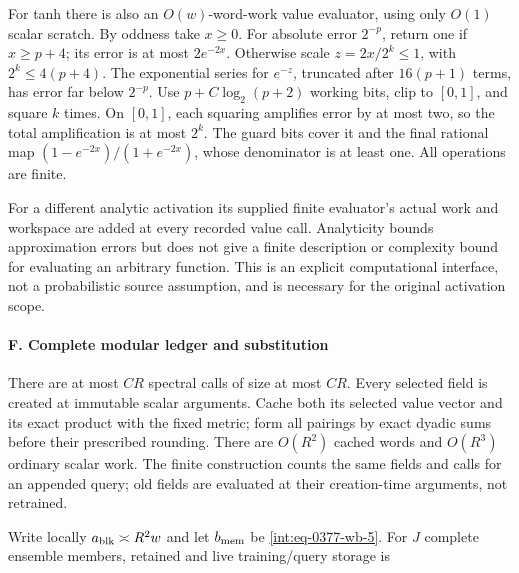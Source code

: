 For tanh there is also an \(O(w)\)-word-work value evaluator, using only \(O(1)\) scalar scratch. By oddness take \(x\ge0\). For absolute error \(2^{-p}\), return one if \(x\ge p+4\); its error is at most \(2e^{-2x}\). Otherwise scale \(z=2x/2^k\le1\), with \(2^k\le4(p+4)\). The exponential series for \(e^{-z}\), truncated after \(16(p+1)\) terms, has error far below \(2^{-p}\). Use \(p+C\log_2(p+2)\) working bits, clip to \([0,\allowbreak 1]\), and square \(k\) times. On \([0,\allowbreak 1]\), each squaring amplifies error by at most two, so the total amplification is at most \(2^k\). The guard bits cover it and the final rational map \((1-e^{-2x})/(1+e^{-2x})\), whose denominator is at least one. All operations are finite.



For a different analytic activation its supplied finite evaluator's actual work and workspace are added at every recorded value call. Analyticity bounds approximation errors but does not give a finite description or complexity bound for evaluating an arbitrary function. This is an explicit computational interface, not a probabilistic source assumption, and is necessary for the original activation scope.


\paragraph{F. Complete modular ledger and substitution}

\mbox{}\par\smallskip


There are at most \(CR\) spectral calls of size at most \(CR\). Every selected field is created at immutable scalar arguments. Cache both its selected value vector and its exact product with the fixed metric; form all pairings by exact dyadic sums before their prescribed rounding. There are \(O(R^2)\) cached words and \(O(R^3)\) ordinary scalar work. The finite construction counts the same fields and calls for an appended query; old fields are evaluated at their creation-time arguments, not retrained.



Write locally \(a_{\rm blk}\asymp R^2w\) and let \(b_{\rm mem}\) be \eqref{int:eq-0377-wb-5}. For \(J\) complete ensemble members, retained and live training/query storage is


